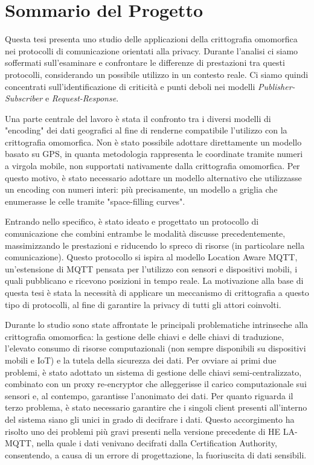 \documentclass[12pt,a4paper,twoside]{book}
\begin{document}
\chapter{Sommario del Progetto}

Questa tesi presenta uno studio delle applicazioni della crittografia omomorfica nei protocolli di comunicazione orientati alla privacy. Durante l'analisi ci siamo soffermati sull'esaminare e confrontare le differenze di prestazioni tra questi protocolli, considerando un possibile utilizzo in un contesto reale. Ci siamo quindi concentrati sull'identificazione di criticità e punti deboli nei modelli \textit{Publisher-Subscriber} e \textit{Request-Response}.

Una parte centrale del lavoro è stata il confronto tra i diversi modelli di "encoding" dei dati geografici al fine di renderne compatibile l'utilizzo con la crittografia omomorfica. Non è stato possibile adottare direttamente un modello basato su GPS, in quanta metodologia rappresenta le coordinate tramite numeri a virgola mobile, non supportati nativamente dalla crittografia omomorfica. Per questo motivo, è stato necessario adottare un modello alternativo che utilizzasse un encoding con numeri interi: più precisamente, un modello a griglia che enumerasse le celle tramite "space-filling curves".

Entrando nello specifico, è stato ideato e progettato un protocollo di comunicazione che combini entrambe le modalità discusse precedentemente, massimizzando le prestazioni e riducendo lo spreco di risorse (in particolare nella comunicazione). Questo protocollo si ispira al modello Location Aware MQTT, un'estensione di MQTT pensata per l'utilizzo con sensori e dispositivi mobili, i quali pubblicano e ricevono posizioni in tempo reale. La motivazione alla base di questa tesi è stata la necessità di applicare un meccanismo di crittografia a questo tipo di protocolli, al fine di garantire la privacy di tutti gli attori coinvolti.

Durante lo studio sono state affrontate le principali problematiche intrinseche alla crittografia omomorfica: la gestione delle chiavi e delle chiavi di traduzione, l'elevato consumo di risorse computazionali (non sempre disponibili su dispositivi mobili e IoT) e la tutela della sicurezza dei dati. Per ovviare ai primi due problemi, è stato adottato un sistema di gestione delle chiavi semi-centralizzato, combinato con un proxy re-encryptor che alleggerisse il carico computazionale sui sensori e, al contempo, garantisse l'anonimato dei dati. Per quanto riguarda il terzo problema, è stato necessario garantire che i singoli client presenti all'interno del sistema siano gli unici in grado di decifrare i dati. Questo accorgimento ha risolto uno dei problemi più gravi presenti nella versione precedente di HE LA-MQTT, nella quale i dati venivano decifrati dalla Certification Authority, consentendo, a causa di un errore di progettazione, la fuoriuscita di dati sensibili.
\end{document}
